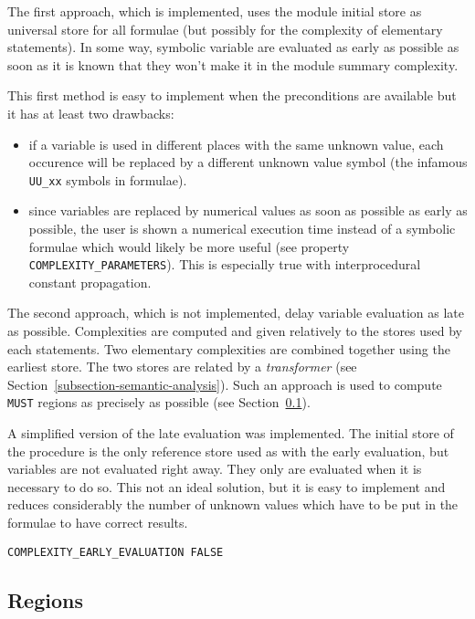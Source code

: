 The first approach, which is implemented, uses the module initial store
as universal store for all formulae (but possibly for the complexity of
elementary statements).  In some way, symbolic variable are evaluated as
early as possible as soon as it is known that they won't make it in the
module summary complexity.

This first method is easy to implement when the preconditions are available
but it has at least two drawbacks:

\begin{itemize}

  \item if a variable is used in different places with the same unknown
value, each occurence will be replaced by a different unknown value
symbol (the infamous \verb+UU_xx+ symbols in formulae).

  \item since variables are replaced by numerical values as soon as
possible as early as possible, the user is shown a numerical execution
time instead of a symbolic formulae which would likely be more useful
(see property \verb+COMPLEXITY_PARAMETERS+). This is especially true
with interprocedural constant propagation.

\end{itemize}

The second approach, which is not implemented, delay variable evaluation
as late as possible. Complexities are computed and given relatively to
the stores used by each statements. Two elementary complexities are combined
together using the earliest store. The two stores are related by a {\em
transformer} (see Section~\ref{subsection-semantic-analysis}). Such an
approach is used to compute {\tt MUST} regions as precisely as possible
(see Section~\ref{subsection-regions}).

A simplified version of the late evaluation was implemented. The initial
store of the procedure is the only reference store used as with the
early evaluation, but variables are not evaluated right away. They only
are evaluated when it is necessary to do so. This not an ideal solution,
but it is easy to implement and reduces considerably the number of
unknown values which have to be put in the formulae to have correct
results.


\begin{verbatim}
COMPLEXITY_EARLY_EVALUATION FALSE
\end{verbatim}

\subsection{Regions}
\label{subsection-regions}

